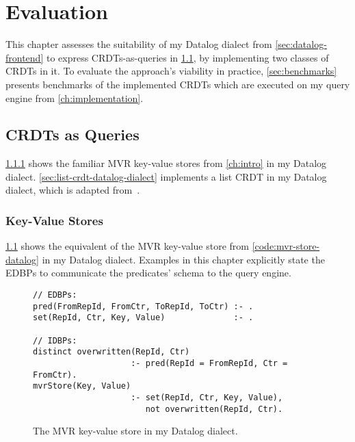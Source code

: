 
\chapter{Evaluation}\label{ch:evaluation}

This chapter assesses the suitability of my Datalog dialect from
\ref{sec:datalog-frontend} to express \acp{CRDT}-as-queries
in \ref{sec:crdts-as-queries}, by implementing two classes of \acp{CRDT} in it.
To evaluate the approach's viability in practice,
\ref{sec:benchmarks} presents benchmarks of the implemented \acp{CRDT}
which are executed on my query engine from \ref{ch:implementation}.

\section{\acp{CRDT} as Queries}\label{sec:crdts-as-queries}

\ref{sec:key-value-stores-datalog-dialect} shows the familiar \ac{MVR} key-value
stores from \ref{ch:intro} in my Datalog dialect.
\ref{sec:list-crdt-datalog-dialect} implements a list \ac{CRDT} in my Datalog
dialect, which is adapted from~\cite{kleppmann2018data}.

\subsection{Key-Value Stores}\label{sec:key-value-stores-datalog-dialect}

\ref{code:mvr-store-datalog-dialect} shows the equivalent of the \ac{MVR}
key-value store from \ref{code:mvr-store-datalog} in my Datalog dialect.
Examples in this chapter explicitly state the \acp{EDBP} to communicate the
predicates' schema to the query engine.

\begin{figure}[htpb]
	\begin{lstlisting}[keepspaces]
// EDBPs:
pred(FromRepId, FromCtr, ToRepId, ToCtr) :- .
set(RepId, Ctr, Key, Value)              :- .

// IDBPs:
distinct overwritten(RepId, Ctr)
                    :- pred(RepId = FromRepId, Ctr = FromCtr).
mvrStore(Key, Value)
                    :- set(RepId, Ctr, Key, Value),
                       not overwritten(RepId, Ctr).\end{lstlisting}
	\caption{The \ac{MVR} key-value store in my Datalog dialect.}\label{code:mvr-store-datalog-dialect}
\end{figure}

